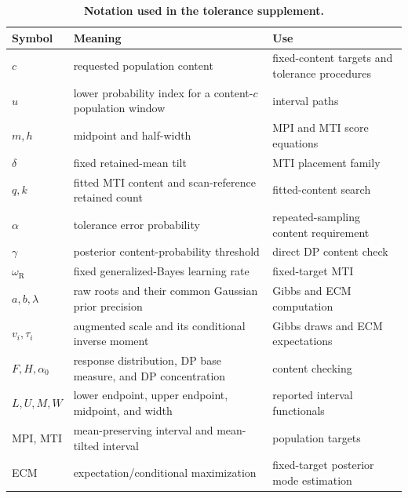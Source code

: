 \documentclass[11pt]{article}
\newcommand{\TableStyle}{\footnotesize\setlength{\tabcolsep}{4pt}\renewcommand{\arraystretch}{1.08}}
\begin{document}
\begin{table}[H]
\centering
\caption{\textbf{Notation used in the tolerance supplement.}}
\label{tab:supp-notation}
\TableStyle
\begin{tabularx}{\textwidth}{@{}l>{\raggedright\arraybackslash}X
  >{\raggedright\arraybackslash}X@{}}
\toprule
Symbol & Meaning & Use\\
\midrule
\(c\) & requested population content & fixed-content targets and tolerance procedures\\
\(u\) & lower probability index for a content-\(c\) population window & interval paths\\
\(m,h\) & midpoint and half-width & MPI and MTI score equations\\
\(\delta\) & fixed retained-mean tilt & MTI placement family\\
\(q,k\) & fitted MTI content and scan-reference retained count & fitted-content search\\
\(\alpha\) & tolerance error probability & repeated-sampling content requirement\\
\(\gamma\) & posterior content-probability threshold & direct DP content check\\
\(\omega_{\mathrm R}\) & fixed generalized-Bayes learning rate & fixed-target MTI\\
\(a,b,\lambda\) & raw roots and their common Gaussian prior precision & Gibbs and ECM computation\\
\(v_i,\tau_i\) & augmented scale and its conditional inverse moment & Gibbs draws and ECM expectations\\
\(F,H,\alpha_0\) & response distribution, DP base measure, and DP concentration & content checking\\
\(L,U,M,W\) & lower endpoint, upper endpoint, midpoint, and width & reported interval functionals\\
MPI, MTI & mean-preserving interval and mean-tilted interval & population targets\\
ECM & expectation/conditional maximization & fixed-target posterior mode estimation\\
\bottomrule
\end{tabularx}
\end{table}
\end{document}
